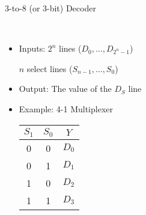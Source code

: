 \begin{frame}[fragile]
		\centerline{3-to-8 (or 3-bit) Decoder}
\BNotes\ifnum{}
~
\fi\ENotes
\end{frame}

\begin{frame}[fragile]
\begin{itemize}
	\item Inputs: $2^n$ lines ($D_0,\dots,D_{2^n-1}$)

		$n$ select lines ($S_{n-1},\dots,S_0$)
	\item Output: The value of the $D_S$ line
	\item Example: 4-1 Multiplexer
		\begin{center}
		\begin{tabular}{cc|c}
		$S_1$ & $S_0$ & $Y$\\\hline
		0 & 0 & $D_0$\\
		0 & 1 & $D_1$\\
		1 & 0 & $D_2$\\
		1 & 1 & $D_3$\\
		\end{tabular}
		\end{center}

\end{itemize}
\end{frame}

